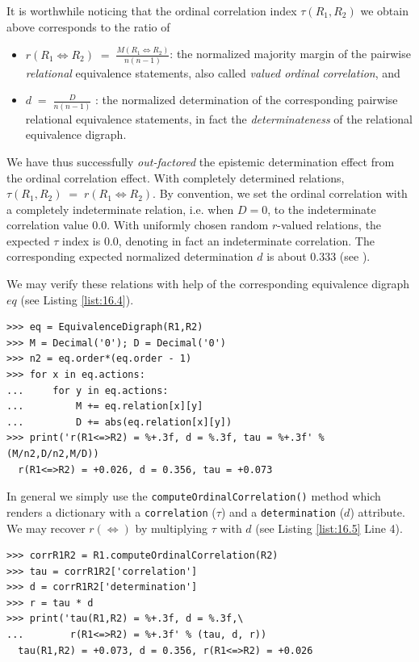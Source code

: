 It is worthwhile noticing that the ordinal correlation index $\tau(R_1,R_2)$ we obtain above corresponds to the ratio of
\begin{itemize}
\item $r(R_1 \Leftrightarrow R_2) \;=\; \frac{M(R_1 \Leftrightarrow R_2)}{n(n-1)}$: the normalized majority margin of the pairwise \emph{relational} equivalence statements, also called \emph{valued ordinal correlation}, and 
\item $d \;=\; \frac{D}{n(n-1)}$ : the normalized determination of the corresponding pairwise relational equivalence statements, in fact the \emph{determinateness} of the relational equivalence digraph.
\end{itemize}

We have thus successfully \emph{out-factored} the epistemic determination effect from the ordinal correlation effect. With completely determined relations, $\tau(R_1,R_2) \;=\; r(R_1 \Leftrightarrow R_2)$. By convention, we set the ordinal correlation with a completely indeterminate relation, i.e. when $D = 0$, to the indeterminate correlation value $0.0$. With uniformly chosen random $r$-valued relations, the expected $\tau$ index is $0.0$, denoting in fact an indeterminate correlation. The corresponding expected normalized determination $d$ is about $0.333$ (see \citep{BIS-2012a}).

We may verify these relations with help of the corresponding equivalence digraph $eq$ (see Listing \ref{list:16.4}).

\begin{lstlisting}[caption={Computing the ordinal correlation index from the equivalence digraph},label=list:16.4]
>>> eq = EquivalenceDigraph(R1,R2)
>>> M = Decimal('0'); D = Decimal('0')
>>> n2 = eq.order*(eq.order - 1)
>>> for x in eq.actions:
...     for y in eq.actions:
...         M += eq.relation[x][y]
...         D += abs(eq.relation[x][y])
>>> print('r(R1<=>R2) = %+.3f, d = %.3f, tau = %+.3f' % (M/n2,D/n2,M/D))   
  r(R1<=>R2) = +0.026, d = 0.356, tau = +0.073  
\end{lstlisting}

In general we simply use the \texttt{computeOrdinalCorrelation()} method which renders a dictionary with a \texttt{correlation} ($\tau$) and a \texttt{determination} ($d$) attribute. We may recover $r(\Leftrightarrow)$ by multiplying $\tau$ with $d$ (see Listing \ref{list:16.5} Line 4). 

\begin{lstlisting}[caption={Directly computing the ordinal correlation index},label=list:16.5]
>>> corrR1R2 = R1.computeOrdinalCorrelation(R2)
>>> tau = corrR1R2['correlation']
>>> d = corrR1R2['determination']
>>> r = tau * d
>>> print('tau(R1,R2) = %+.3f, d = %.3f,\
...        r(R1<=>R2) = %+.3f' % (tau, d, r))
  tau(R1,R2) = +0.073, d = 0.356, r(R1<=>R2) = +0.026
\end{lstlisting}

